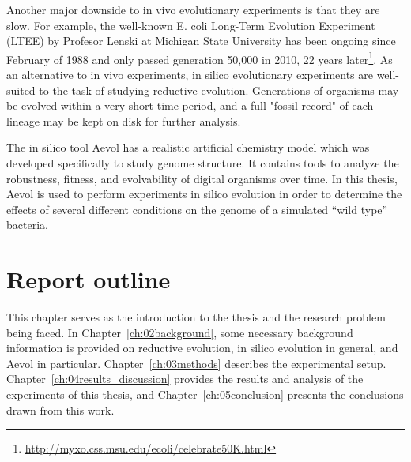Another major downside to in vivo evolutionary experiments is that they are slow. For example, the well-known E. coli Long-Term Evolution Experiment (LTEE) by Profesor Lenski at Michigan State University has been ongoing since February of 1988 and only passed generation 50,000 in 2010, 22 years later\footnote{\url{http://myxo.css.msu.edu/ecoli/celebrate50K.html}}. As an alternative to in vivo experiments, in silico evolutionary experiments are well-suited to the task of studying reductive evolution. Generations of organisms may be evolved within a very short time period, and a full "fossil record" of each lineage may be kept on disk for further analysis. 

The in silico tool Aevol has a realistic artificial chemistry model which was developed specifically to study genome structure. It contains tools to analyze the robustness, fitness, and evolvability of digital organisms over time.  In this thesis, Aevol is used to perform experiments in silico evolution in order to determine the effects of several different conditions on the genome of a simulated ``wild type'' bacteria.

\section*{Report outline}
This chapter serves as the introduction to the thesis and the research problem being faced. In Chapter~\ref{ch:02background}, some necessary background information is provided on reductive evolution, in silico evolution in general, and Aevol in particular. Chapter~\ref{ch:03methods} describes the experimental setup. Chapter~\ref{ch:04results_discussion}
provides the results and analysis of the experiments of this thesis, and Chapter~\ref{ch:05conclusion} presents the conclusions drawn from this work. 


